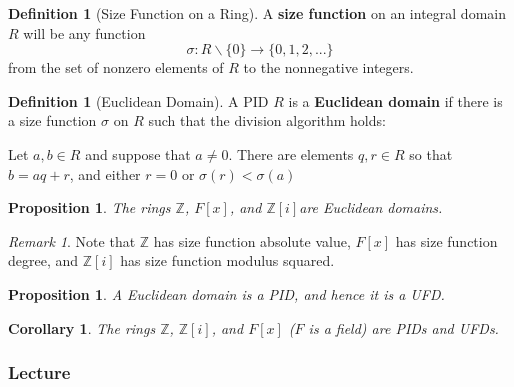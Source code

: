 \documentclass[12pt]{article}
\newtheorem{cor}[thm]{Corollary}
\newtheorem{prop}[thm]{Proposition}
\theoremstyle{definition}
\newtheorem{defn}[thm]{Definition}
\theoremstyle{remark}
\newtheorem{rmk}[thm]{Remark}
\numberwithin{equation}{section}
\newcommand\Z{\mathbb Z}    %
\newcommand\B[1]{\textbf{ #1}}
\begin{document}
\vspace{15pt}

\begin{defn}[Size Function on a Ring]
        A \B{size function} on an integral domain $R$ will be any function \begin{equation}
                \sigma:R\backslash \{0\}\rightarrow \{0,1,2,...\}
        \end{equation}
        from the set of nonzero elements of $R$ to the nonnegative integers.
\end{defn}

\vspace{15pt}

\begin{defn}[Euclidean Domain]
        A PID $R$ is a \B{Euclidean domain} if there is a size function $\sigma$ on $R$ such that the division algorithm holds: \begin{centering}
                Let $a,b \in R$ and suppose that $a \neq 0$. There are elements $q,r \in R$ so that $b = aq+r$, and either $r = 0$ or $\sigma(r) < \sigma(a)$
        \end{centering}
\end{defn}


\vspace{15pt}

\begin{prop}
        The rings $\Z$, $F[x]$, and $\Z[i]$are Euclidean domains.
\end{prop}

\begin{rmk}
        Note that $\Z$ has size function absolute value, $F[x]$ has size function degree, and $\Z[i]$ has size function modulus squared.
\end{rmk}

\vspace{15pt}


\begin{prop}
        A Euclidean domain is a PID, and hence it is a UFD.
\end{prop}

\vspace{15pt}

\begin{cor}
        The rings $\Z$, $\Z[i]$, and $F[x]$ ($F$ is a field) are PIDs and UFDs.
\end{cor}

\vspace{15pt}

\subsubsection{Lecture}
\end{document}
